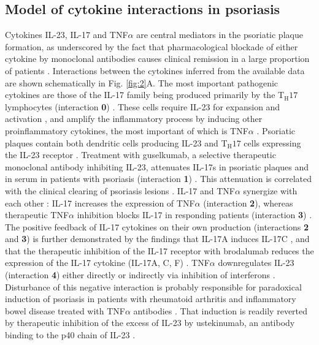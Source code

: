 \subsection{Model of cytokine interactions in psoriasis}
Cytokines IL-23, IL-17 and TNF$\alpha$ are central mediators in the psoriatic plaque formation, as underscored by the fact that pharmacological blockade of either cytokine by monoclonal antibodies causes clinical remission in a large proportion of patients \citep{jabbar2017}. Interactions between the cytokines inferred from the available data are shown schematically in Fig. \ref{fig:2}A. The most important pathogenic cytokines are those of the IL-17 family being produced primarily by the T$_{\text{H}}17$ lymphocytes (interaction \textbf{0}) \citep{krueger2012}. These cells require IL-23 for expansion and activation \citep{cosmi2008, wilson2007, zheng2007}, and amplify the inflammatory process by inducing other proinflammatory cytokines, the most important of which is TNF$\alpha$ \citep{boehncke2015}. Psoriatic plaques contain both dendritic cells producing IL-23 and T$_{\text{H}}17$ cells expressing the IL-23 receptor \citep{cosmi2008, lee2004, tillack2014, wilson2007}. Treatment with guselkumab, a selective therapeutic monoclonal antibody inhibiting IL-23, attenuates IL-17s in psoriatic plaques and in serum in patients with psoriasis (interaction \textbf{1}) \citep{hawkes2018,sofen2014,tillack2014}. This attenuation is correlated with the clinical clearing of psoriasis lesions \citep{sofen2014}. IL-17 and TNF$\alpha$ synergize with each other \citep{alzabin2012, krueger2012, xu2017}: IL-17 increases the expression of TNF$\alpha$ \citep{jovanovic1998} (interaction \textbf{2}), whereas therapeutic TNF$\alpha$ inhibition blocks IL-17 in responding patients (interaction \textbf{3}) \citep{zaba2007, zaba2009}. The positive feedback of IL-17 cytokines on their own production (interactions \textbf{2} and \textbf{3}) is further demonstrated by the findings that IL-17A induces IL-17C \citep{xu2018}, and that the therapeutic inhibition of the IL-17 receptor with brodalumab reduces the expression of the IL-17 cytokine (IL-17A, C, F) \citep{russell2014}. TNF$\alpha$ downregulates IL-23 (interaction \textbf{4}) either directly \citep{notley2008, zakharova2005} or indirectly via inhibition of interferons \citep{palucka2005, tillack2014}. Disturbance of this negative interaction is probably responsible for paradoxical induction of psoriasis in patients with rheumatoid arthritis and inflammatory bowel disease treated with TNF$\alpha$ antibodies \citep{palucka2005, tillack2014}. That induction is readily reverted by therapeutic inhibition of the excess of IL-23 by ustekinumab, an antibody binding to the p40 chain of IL-23 \citep{tillack2014}. 

